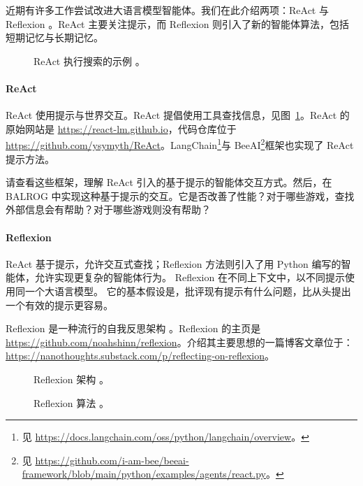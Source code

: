 近期有许多工作尝试改进大语言模型智能体。我们在此介绍两项：ReAct \citep{yao2022react} 与 Reflexion \citep{shinn2024reflexion}。ReAct 主要关注提示，而 Reflexion 则引入了新的智能体算法，包括短期记忆与长期记忆。

\begin{figure}
    \centering
    
    \caption{ReAct 执行搜索的示例 \citep{yao2022react}。}
    \label{fig:react}
\end{figure}

\paragraph{ReAct}
ReAct 使用提示与世界交互。ReAct 提倡使用工具查找信息，见图~\ref{fig:react}。ReAct 的原始网站是 \url{https://react-lm.github.io}，代码仓库位于 \url{https://github.com/ysymyth/ReAct}。LangChain\footnote{见 \url{https://docs.langchain.com/oss/python/langchain/overview}。}与 BeeAI\footnote{见 \url{https://github.com/i-am-bee/beeai-framework/blob/main/python/examples/agents/react.py}。}框架也实现了 ReAct 提示方法。

请查看这些框架，理解 ReAct 引入的基于提示的智能体交互方式。然后，在 BALROG 中实现这种基于提示的交互。它是否改善了性能？对于哪些游戏，查找外部信息会有帮助？对于哪些游戏则没有帮助？

\paragraph{Reflexion}
ReAct 基于提示，允许交互式查找；Reflexion 方法则引入了用 Python 编写的智能体，允许实现更复杂的智能体行为。
Reflexion 在不同上下文中，以不同提示使用同一个大语言模型。
它的基本假设是，批评现有提示有什么问题，比从头提出一个有效的提示更容易。

Reflexion 是一种流行的自我反思架构 \citep{shinn2024reflexion}。Reflexion 的主页是 \url{https://github.com/noahshinn/reflexion}。介绍其主要思想的一篇博客文章位于：\url{https://nanothoughts.substack.com/p/reflecting-on-reflexion}。

\begin{figure}
    \centering
    
    \caption{Reflexion 架构 \citep{shinn2024reflexion}。}
    \label{fig:reflexion-alg}
\end{figure}

\begin{figure}
    \centering
    
    \caption{Reflexion 算法 \citep{shinn2024reflexion}。}
    \label{fig:reflexion-code}
\end{figure}

